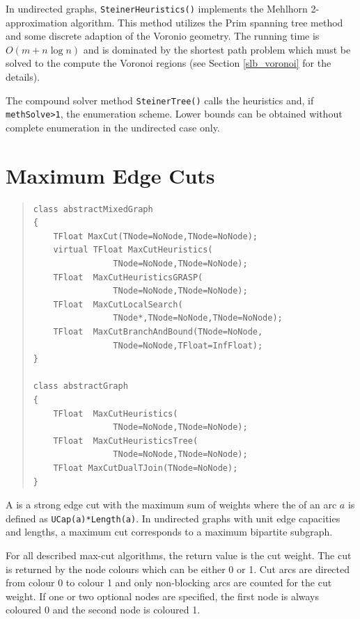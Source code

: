 \documentclass[a4paper,11pt,twoside]{book}
\begin{document}
\begin{multicols}{2}
In undirected graphs, \verb/SteinerHeuristics()/ implements the Mehlhorn
2-approximation algorithm. This method utilizes the Prim spanning tree method
and some discrete adaption of the Voronio geometry. The running time is
$O(m+n\log n)$ and is dominated by the shortest path problem which must be
solved to the compute the Voronoi regions (see Section \ref{slb_voronoi} for
the details).

The compound solver method \verb/SteinerTree()/ calls the heuristics and, if
\verb/methSolve>1/, the enumeration scheme. Lower bounds can be obtained
without complete enumeration in the undirected case only.


\section{Maximum Edge Cuts}
\label{slb_solve_maxcut}
\methods
\begin{quote}
\begin{verbatim}
class abstractMixedGraph
{
    TFloat MaxCut(TNode=NoNode,TNode=NoNode);
    virtual TFloat MaxCutHeuristics(
                TNode=NoNode,TNode=NoNode);
    TFloat  MaxCutHeuristicsGRASP(
                TNode=NoNode,TNode=NoNode);
    TFloat  MaxCutLocalSearch(
                TNode*,TNode=NoNode,TNode=NoNode);
    TFloat  MaxCutBranchAndBound(TNode=NoNode,
                TNode=NoNode,TFloat=InfFloat);
}

class abstractGraph
{
    TFloat  MaxCutHeuristics(
                TNode=NoNode,TNode=NoNode);
    TFloat  MaxCutHeuristicsTree(
                TNode=NoNode,TNode=NoNode);
    TFloat MaxCutDualTJoin(TNode=NoNode);
}
\end{verbatim}
\end{quote}
A  is a strong edge cut with the maximum sum of weights where
the  of an arc $a$ is defined as \verb/UCap(a)*Length(a)/.
In undirected graphs with unit edge capacities and lengths, a maximum cut
corresponds to a maximum bipartite subgraph.

For all described max-cut algorithms, the return value is the cut weight. The
cut is returned by the node colours which can be either 0 or 1. Cut arcs are
directed from colour 0 to colour 1 and only non-blocking arcs are counted for
the cut weight. If one or two optional nodes are specified, the first node is
always coloured 0 and the second node is coloured 1.


\end{multicols}
\end{document}
